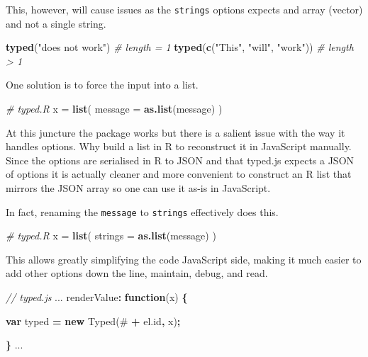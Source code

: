 \documentclass[
]{krantz}
\makeatletter
\newenvironment{Shaded}{\begin{snugshade}}{\end{snugshade}}
\newcommand{\AttributeTok}[1]{\textcolor[rgb]{0.61,0.61,0.61}{#1}}
\newcommand{\CommentTok}[1]{\textcolor[rgb]{0.37,0.37,0.37}{\textit{#1}}}
\newcommand{\DataTypeTok}[1]{\textcolor[rgb]{0.27,0.27,0.27}{#1}}
\newcommand{\KeywordTok}[1]{\textcolor[rgb]{0.27,0.27,0.27}{\textbf{#1}}}
\newcommand{\NormalTok}[1]{#1}
\newcommand{\OperatorTok}[1]{\textcolor[rgb]{0.43,0.43,0.43}{\textbf{#1}}}
\newcommand{\StringTok}[1]{\textcolor[rgb]{0.5,0.5,0.5}{#1}}
\newcommand{\VariableTok}[1]{\textcolor[rgb]{0,0,0}{#1}}
\newenvironment{kframe}{%
\medskip{}
\setlength{\fboxsep}{.8em}
 \def\at@end@of@kframe{}%
 \ifinner\ifhmode%
  \def\at@end@of@kframe{\end{minipage}}%
  \begin{minipage}{\columnwidth}%
 \fi\fi%
 \def\FrameCommand##1{\hskip\@totalleftmargin \hskip-\fboxsep
 \colorbox{shadecolor}{##1}\hskip-\fboxsep
     \hskip-\linewidth \hskip-\@totalleftmargin \hskip\columnwidth}%
 \MakeFramed {\advance\hsize-\width
   \@totalleftmargin\z@ \linewidth\hsize
   \@setminipage}}%
 {\par\unskip\endMakeFramed%
 \at@end@of@kframe}
\renewenvironment{Shaded}{\begin{kframe}}{\end{kframe}}
\makeatother
\begin{document}
This, however, will cause issues as the \texttt{strings} options expects and array (vector) and not a single string.

\begin{Shaded}
\begin{Highlighting}[]
\KeywordTok{typed}\NormalTok{(}\StringTok{"does not work"}\NormalTok{) }\CommentTok{\# length =  1}
\KeywordTok{typed}\NormalTok{(}\KeywordTok{c}\NormalTok{(}\StringTok{"This"}\NormalTok{, }\StringTok{"will"}\NormalTok{, }\StringTok{"work"}\NormalTok{)) }\CommentTok{\# length > 1}
\end{Highlighting}
\end{Shaded}

One solution is to force the input into a list.

\begin{Shaded}
\begin{Highlighting}[]
\CommentTok{\# typed.R}
\NormalTok{x =}\StringTok{ }\KeywordTok{list}\NormalTok{(}
  \DataTypeTok{message =} \KeywordTok{as.list}\NormalTok{(message)}
\NormalTok{)}
\end{Highlighting}
\end{Shaded}

At this juncture the package works but there is a salient issue with the way it handles options. Why build a list in R to reconstruct it in JavaScript manually. Since the options are serialised in R to JSON and that typed.js expects a JSON of options it is actually cleaner and more convenient to construct an R list that mirrors the JSON array so one can use it as-is in JavaScript.

In fact, renaming the \texttt{message} to \texttt{strings} effectively does this.

\begin{Shaded}
\begin{Highlighting}[]
\CommentTok{\# typed.R}
\NormalTok{x =}\StringTok{ }\KeywordTok{list}\NormalTok{(}
  \DataTypeTok{strings =} \KeywordTok{as.list}\NormalTok{(message)}
\NormalTok{)}
\end{Highlighting}
\end{Shaded}

This allows greatly simplifying the code JavaScript side, making it much easier to add other options down the line, maintain, debug, and read.

\begin{Shaded}
\begin{Highlighting}[]
\CommentTok{// typed.js}
\NormalTok{...}
\NormalTok{renderValue}\OperatorTok{:} \KeywordTok{function}\NormalTok{(x) }\OperatorTok{\{}

  \KeywordTok{var}\NormalTok{ typed }\OperatorTok{=} \KeywordTok{new} \AttributeTok{Typed}\NormalTok{(}\StringTok{\textquotesingle{}\#\textquotesingle{}} \OperatorTok{+} \VariableTok{el}\NormalTok{.}\AttributeTok{id}\OperatorTok{,}\NormalTok{ x)}\OperatorTok{;}

\OperatorTok{\}}
\NormalTok{...}
\end{Highlighting}
\end{Shaded}
\end{document}
